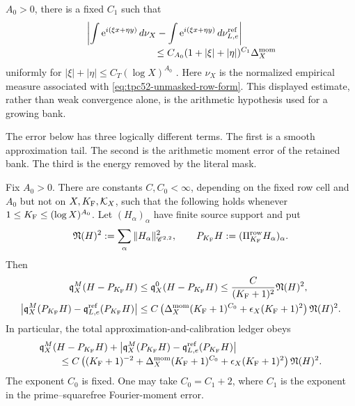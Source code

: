 \(A_0>0\), there is a fixed \(C_1\) such that
\begin{align}
 &\left|\int \e^{i(\xi x+\eta y)}\,d\nu_X
       -\int \e^{i(\xi x+\eta y)}\,d\nu_{L,e}^{\rm ref}\right|
 \notag\\[-2pt]
  &\hspace{25mm}\le C_{A_0}(1+|\xi|+|\eta|)^{C_1}\Delta_X^{\rm mom}
 \label{eq:tpc52-inherited-Fourier-moment}
\end{align}
uniformly for \(|\xi|+|\eta|\le C_T(\log X)^{A_0}\)
\citep{WangTPC51}.  Here \(\nu_X\) is the normalized empirical measure
associated with \eqref{eq:tpc52-unmasked-row-form}.  This displayed
estimate, rather than weak convergence alone, is the arithmetic hypothesis
used for a growing bank.

The error below has three logically different terms.  The first is a
smooth approximation tail.  The second is the arithmetic moment error
of the retained bank.  The third is the energy removed by the literal
mask.

\begin{theorem}
\label{thm:tpc52-sampled-cosine-compression}
Fix \(A_0>0\).  There are constants \(C,C_0<\infty\), depending on
the fixed row cell and \(A_0\) but not on \(X,K_{\rm F},\mathcal K_X\), such that
the following holds whenever
\(1\leq K_{\rm F}\leq(\log X)^{A_0}\).  Let
\((H_\alpha)_\alpha\) have finite source support and put
\begin{equation}
 \mathfrak N(H)^2
 :=\sum_\alpha\|H_\alpha\|_{\mathscr C^{2,2}}^2,
 \qquad
 P_{K_{\rm F}}H:=(\Pi_{K_{\rm F}}^{\rm row}H_\alpha)_\alpha.
 \label{eq:tpc52-family-regularity-energy}
\end{equation}
Then
\begin{align}
 \mathfrak q_X^M(H-P_{K_{\rm F}}H)
 &\leq\mathfrak q_X^0(H-P_{K_{\rm F}}H)
 \leq \frac{C}{(K_{\rm F}+1)^2}\mathfrak N(H)^2,
 \label{eq:tpc52-discrete-relative-tail}\\
 \left|
  \mathfrak q_X^M(P_{K_{\rm F}}H)-
  \mathfrak q_{L,e}^{\rm ref}(P_{K_{\rm F}}H)
 \right|
 &\leq C\left(
   \Delta_X^{\rm mom}(K_{\rm F}+1)^{C_0}
   +\epsilon_X(K_{\rm F}+1)^2\right)\mathfrak N(H)^2.
 \label{eq:tpc52-bank-calibration-error}
\end{align}
In particular, the total approximation-and-calibration ledger obeys
\begin{align}
 &\mathfrak q_X^M(H-P_{K_{\rm F}}H)
 +\left|
  \mathfrak q_X^M(P_{K_{\rm F}}H)-
  \mathfrak q_{L,e}^{\rm ref}(P_{K_{\rm F}}H)
 \right|
 \notag\\[-2pt]
 &\qquad\leq C\left(
  (K_{\rm F}+1)^{-2}
  +\Delta_X^{\rm mom}(K_{\rm F}+1)^{C_0}
  +\epsilon_X(K_{\rm F}+1)^2\right)\mathfrak N(H)^2.
 \label{eq:tpc52-total-discrete-compression-error}
\end{align}
The exponent \(C_0\) is fixed.  One may take \(C_0=C_1+2\), where
\(C_1\) is the exponent in the prime--squarefree Fourier-moment error.
\end{theorem}

